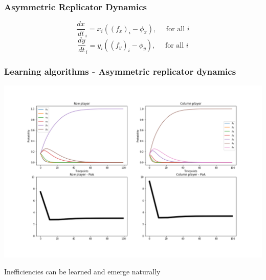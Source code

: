 \begin{frame}
    \frametitle{Asymmetric Replicator Dynamics}
    \centering

    \[
        \frac{dx}{dt}_i = x_i((f_x)_i - \phi_x), \quad \text{ for all }i
    \]
    \[
        \frac{dy}{dt}_i = y_i((f_y)_i - \phi_y), \quad \text{ for all }i
    \]
    
\end{frame}





\begin{frame}
    \frametitle{Learning algorithms - Asymmetric replicator dynamics}

    \includegraphics[scale=0.28]{Bin/ARD_game.png}
\end{frame}

\begin{frame}
    \centering
    \Huge{
    Inefficiencies can be learned and emerge naturally
    }
\end{frame}


